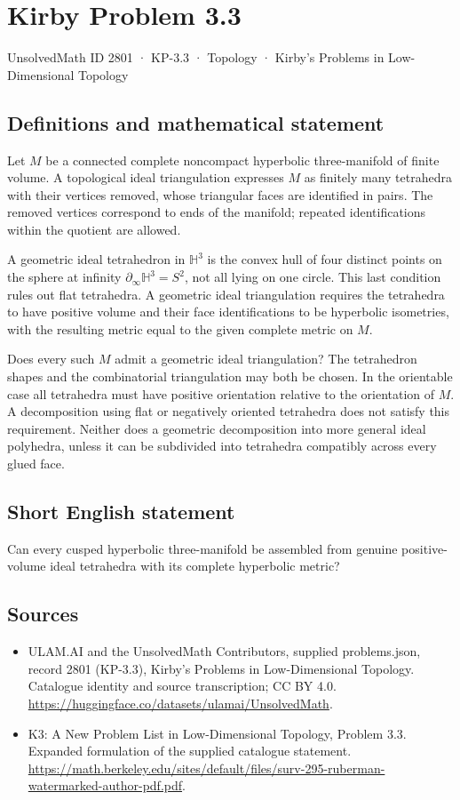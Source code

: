 \documentclass[11pt,a4paper]{article}
\begin{document}
\section*{Kirby Problem 3.3}\label{2801}
{\small UnsolvedMath ID 2801 · KP-3.3 · Topology · Kirby's Problems in Low-Dimensional Topology}
\subsection{Definitions and mathematical statement}
Let $M$ be a connected complete noncompact hyperbolic three-manifold of finite
volume. A topological ideal triangulation expresses $M$ as finitely many
tetrahedra with their vertices removed, whose triangular faces are identified
in pairs. The removed vertices correspond to ends of the manifold; repeated
identifications within the quotient are allowed.

A geometric ideal tetrahedron in $\mathbb H^3$ is the convex hull of four
distinct points on the sphere at infinity $\partial_\infty\mathbb H^3=S^2$,
not all lying on one circle. This last condition rules out flat tetrahedra.
A geometric ideal triangulation requires the tetrahedra to have positive
volume and their face identifications to be hyperbolic isometries, with the
resulting metric equal to the given complete metric on $M$.

Does every such $M$ admit a geometric ideal triangulation? The tetrahedron
shapes and the combinatorial triangulation may both be chosen. In the
orientable case all tetrahedra must have positive orientation relative to the
orientation of $M$. A decomposition using flat or negatively oriented
tetrahedra does not satisfy this requirement. Neither does a geometric
decomposition into more general ideal polyhedra, unless it can be subdivided
into tetrahedra compatibly across every glued face.
\subsection{Short English statement}
Can every cusped hyperbolic three-manifold be assembled from genuine positive-volume ideal tetrahedra with its complete hyperbolic metric?
\subsection{Sources}
\begin{itemize}
\item[S1] ULAM.AI and the UnsolvedMath Contributors, supplied problems.json, record 2801 (KP-3.3), Kirby's Problems in Low-Dimensional Topology. Catalogue identity and source transcription; CC BY 4.0.
\url{https://huggingface.co/datasets/ulamai/UnsolvedMath}.
\item[S2] K3: A New Problem List in Low-Dimensional Topology, Problem 3.3. Expanded formulation of the supplied catalogue statement.
\url{https://math.berkeley.edu/sites/default/files/surv-295-ruberman-watermarked-author-pdf.pdf}.
\end{itemize}
\end{document}
